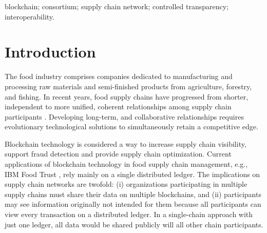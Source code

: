 \documentclass[conference,a4paper]{cs-techrep}
\begin{document}
\selectlanguage{\cstechrepLang}

\maketitle

\begin{abstract}
We consider the problem of supply chain data visibility in a blockchain-enabled supply chain network.
%
Existing methods typically record transactions happening in a supply chain on a single blockchain and are limited in their ability to deal with different levels of data visibility.
%
To address this limitation, we present FoodFresh -- a multi-chain consortium where organizations store immutable data on their blockchains.
%
A decentralized hub coordinates the cross-chain exchange of digital assets among the heterogeneous blockchains.
%
Mechanisms for enabling blockchain interoperability help to preserve the benefits of independent sovereign blockchains while allowing for data sharing across blockchain boundaries.
\end{abstract}

\begin{IEEEkeywords}
blockchain; consortium; supply chain network; controlled transparency; interoperability.
\end{IEEEkeywords}


\section{Introduction} \label{s:introduction}
The food industry comprises companies dedicated to manufacturing and processing raw materials and semi-finished products from agriculture, forestry, and fishing. In recent years, food supply chains have progressed from shorter, independent to more unified, coherent relationships among supply chain participants \cite{bourlakis2008food}. Developing long-term, and collaborative relationships requires evolutionary technological solutions to simultaneously retain a competitive edge. 

Blockchain technology is considered a way to increase supply chain visibility, support fraud detection and provide supply chain optimization. Current applications of blockchain technology in food supply chain management, e.g., IBM Food Trust \cite{ibmFoodTrust2019}, rely mainly on a single distributed ledger. The implications on supply chain networks are twofold: (i) organizations participating in multiple supply chains must share their data on multiple blockchains, and (ii) participants may see information originally not intended for them because all participants can view every transaction on a distributed ledger. In a single-chain approach with just one ledger, all data would be shared publicly will all other chain participants.
\end{document}

